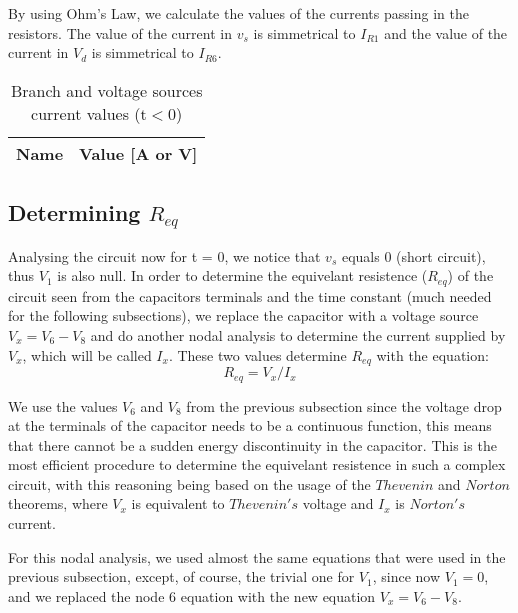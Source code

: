 By using Ohm's Law, we calculate the values of the currents passing in the resistors. The value of the current in $v_s$ is simmetrical to $I_{R1}$ and the value of the current in $V_d$ is simmetrical to $I_{R6}$.
\begin{table}[H]
  \centering
  \begin{tabular}{|l|r|}
    \hline    
    {\bf Name} & {\bf Value [A or V]} \\ \hline
    
  \end{tabular}
  \caption{Branch and voltage sources current values (t$<$0)}
  \label{tab:mat1}
\end{table}



\subsection{Determining $R_{eq}$}

Analysing the circuit now for t = 0, we notice that $v_s$ equals 0 (short circuit), thus $V_1$ is also null.
In order to determine the equivelant resistence ($R_{eq}$) of the circuit seen from the capacitors terminals and the time constant (much needed for the following subsections), we replace the capacitor with a voltage source $V_x = V_6 - V_8$ and do another nodal analysis to determine the current supplied by $V_x$, which will be called $I_x$.
These two values determine $R_{eq}$ with the equation:
\begin{equation}
R_{eq} = V_x/I_x
\label{eq:1.9}
\end{equation}

We use the values $V_6$ and $V_8$ from the previous subsection since the voltage drop at the terminals of the capacitor needs to be a continuous function, this means that there cannot be a sudden energy discontinuity in the capacitor.
This is the most efficient procedure to determine the equivelant resistence in such a complex circuit, with this reasoning being based on the usage of the $Thevenin$ and $Norton$ theorems, where $V_x$ is equivalent to $Thevenin's$ voltage and $I_x$ is $Norton's$ current.

For this nodal analysis, we used almost the same equations that were used in the previous subsection, except, of course, the trivial one for $V_1$, since now $V_1 = 0$, and we replaced the node 6 equation with the new equation $V_x = V_6 - V_8$.

